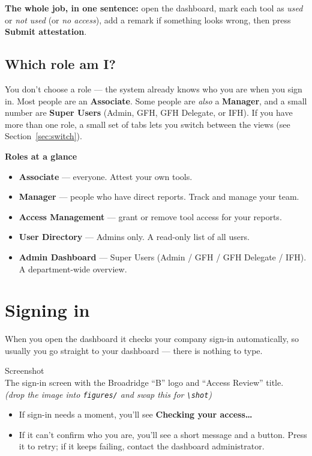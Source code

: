 \documentclass[11pt]{article}
\newcommand{\shotph}[1]{%
  \begin{center}
  \begin{tcolorbox}[enhanced, colback=soft, colframe=brand, boxrule=0pt,
       arc=4pt, left=8pt, right=8pt, top=20pt, bottom=20pt, width=\linewidth,
       borderline={0.6pt}{0pt}{brand, dashed}]
    \centering
    {\color{brand}\faImage\;\large Screenshot}\\[5pt]
    {\footnotesize\color{muted} #1}\\[3pt]
    {\scriptsize\color{muted}\itshape (drop the image into \texttt{figures/} and swap this for \texttt{{\textbackslash}shot})}
  \end{tcolorbox}
  \end{center}}
\newcommand{\role}[1]{{\color{brandDark}\bfseries #1}}
\begin{document}
\begin{tipbox}
\faLightbulb\; \textbf{The whole job, in one sentence:} open the dashboard, mark
each tool as \emph{used} or \emph{not used} (or \emph{no access}), add a remark if
something looks wrong, then press \textbf{Submit attestation}.
\end{tipbox}

\subsection{Which role am I?}
You don't choose a role --- the system already knows who you are when you sign in.
Most people are an \role{Associate}. Some people are \emph{also} a \role{Manager},
and a small number are \role{Super Users} (Admin, GFH, GFH Delegate, or IFH). If
you have more than one role, a small set of tabs lets you switch between the views
(see Section~\ref{sec:switch}).

\begin{notebox}
\faInfoCircle\; \textbf{Roles at a glance}
\begin{itemize}[leftmargin=1.4em, itemsep=2pt]
  \item \role{Associate} --- everyone. Attest your own tools.
  \item \role{Manager} --- people who have direct reports. Track and manage your team.
  \item \role{Access Management} --- grant or remove tool access for your reports.
  \item \role{User Directory} --- Admins only. A read-only list of all users.
  \item \role{Admin Dashboard} --- Super Users (Admin / GFH / GFH Delegate / IFH).
        A department-wide overview.
\end{itemize}
\end{notebox}

\section{Signing in}

When you open the dashboard it checks your company sign-in automatically, so
usually you go straight to your dashboard --- there is nothing to type.

\shotph{The sign-in screen with the Broadridge ``B'' logo and ``Access Review'' title.}

\begin{itemize}[leftmargin=1.4em]
  \item If sign-in needs a moment, you'll see \textbf{Checking your access\ldots}
  \item If it can't confirm who you are, you'll see a short message and a
         button. Press it to retry; if it keeps failing,
        contact the dashboard administrator.
\end{itemize}
\end{document}
